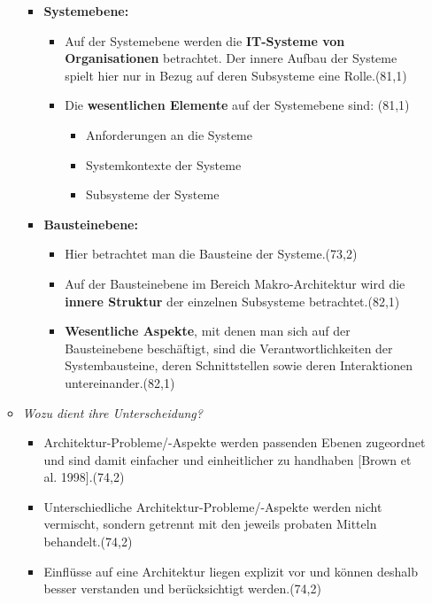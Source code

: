 \begin{enumerate}[(a)]
\begin{itemize}
\begin{itemize}
            
            \item \textbf{Systemebene:}
            \begin{itemize}
                \item Auf der Systemebene werden die \textbf{IT-Systeme von Organisationen} betrachtet. Der innere Aufbau der Systeme spielt hier nur in Bezug auf deren Subsysteme eine Rolle.(81,1) 
                \item Die \textbf{wesentlichen Elemente} auf der Systemebene sind: (81,1)
                \begin{itemize}
                    \item Anforderungen an die Systeme
                    \item Systemkontexte der Systeme
                    \item Subsysteme der Systeme
                \end{itemize}
            \end{itemize}
         
            
            \item \textbf{Bausteinebene:}
            \begin{itemize}
                \item Hier betrachtet man die Bausteine der Systeme.(73,2)
                \item Auf der Bausteinebene im Bereich Makro-Architektur wird die \textbf{innere Struktur} der einzelnen Subsysteme betrachtet.(82,1)
                \item \textbf{Wesentliche Aspekte}, mit denen man sich auf der Bausteinebene beschäftigt, sind die Verantwortlichkeiten der Systembausteine, deren Schnittstellen sowie deren Interaktionen untereinander.(82,1)
            \end{itemize}
            
            
        \end{itemize}
        
        \item {\itshape Wozu dient ihre Unterscheidung?}
        \begin{itemize}
            \item Architektur-Probleme/-Aspekte werden passenden Ebenen zugeordnet und sind damit einfacher und einheitlicher zu handhaben [Brown et al. 1998].(74,2)
            \item Unterschiedliche Architektur-Probleme/-Aspekte werden nicht vermischt, sondern getrennt mit den jeweils probaten Mitteln behandelt.(74,2)
            \item Einflüsse auf eine Architektur liegen explizit vor und können deshalb besser verstanden und berücksichtigt werden.(74,2)




\end{itemize}
\end{itemize}
\end{enumerate}

